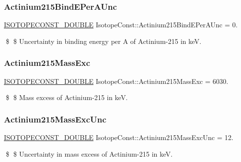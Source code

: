 \subsubsection{\texorpdfstring{Actinium215\+Bind\+E\+Per\+A\+Unc}{Actinium215BindEPerAUnc}}
{\footnotesize\ttfamily \mbox{\hyperlink{group___isotope_const-_macros_ga8f45a7272ce02c0b4c65c44636ed719a}{I\+S\+O\+T\+O\+P\+E\+C\+O\+N\+S\+T\+\_\+\+D\+O\+U\+B\+LE}} Isotope\+Const\+::\+Actinium215\+Bind\+E\+Per\+A\+Unc = 0.}

\$ \$ Uncertainty in binding energy per A of Actinium-\/215 in keV. \mbox{\label{group___isotope_const-_actinium-_ac215_ga675affb1d400e0ee84580d9c798cdac9}} 
\subsubsection{\texorpdfstring{Actinium215\+Mass\+Exc}{Actinium215MassExc}}
{\footnotesize\ttfamily \mbox{\hyperlink{group___isotope_const-_macros_ga8f45a7272ce02c0b4c65c44636ed719a}{I\+S\+O\+T\+O\+P\+E\+C\+O\+N\+S\+T\+\_\+\+D\+O\+U\+B\+LE}} Isotope\+Const\+::\+Actinium215\+Mass\+Exc = 6030.}

\$ \$ Mass excess of Actinium-\/215 in keV. \mbox{\label{group___isotope_const-_actinium-_ac215_gaf91a8b724154fd7de5e35f7fd0dae921}} 
\subsubsection{\texorpdfstring{Actinium215\+Mass\+Exc\+Unc}{Actinium215MassExcUnc}}
{\footnotesize\ttfamily \mbox{\hyperlink{group___isotope_const-_macros_ga8f45a7272ce02c0b4c65c44636ed719a}{I\+S\+O\+T\+O\+P\+E\+C\+O\+N\+S\+T\+\_\+\+D\+O\+U\+B\+LE}} Isotope\+Const\+::\+Actinium215\+Mass\+Exc\+Unc = 12.}

\$ \$ Uncertainty in mass excess of Actinium-\/215 in keV. \mbox{\label{group___isotope_const-_actinium-_ac215_gadeaa823922aae5990586e51df810f005}} 

